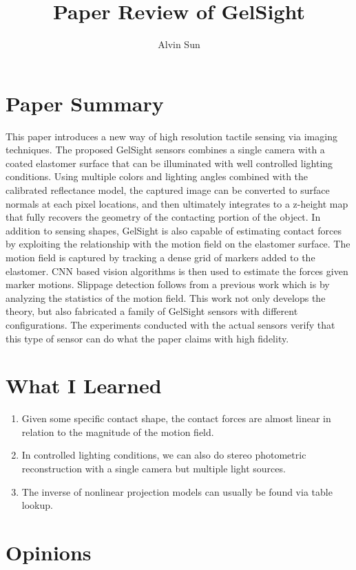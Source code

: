\documentclass[10pt, twocolumn]{article}
\title{\vspace{-3.0em}Paper Review of GelSight}
\author{Alvin Sun}
\begin{document}
\maketitle

\section{Paper Summary}
This paper introduces a new way of high resolution tactile sensing via
imaging techniques. The proposed GelSight sensors combines a single camera
with a coated elastomer surface that can be illuminated with well controlled
lighting conditions. Using multiple colors and lighting angles combined with
the calibrated reflectance model, the captured image can be converted to
surface normals at each pixel locations, and then ultimately integrates to
a z-height map that fully recovers the geometry of the contacting portion of
the object. In addition to sensing shapes, GelSight is also capable of estimating
contact forces by exploiting the relationship with the motion field on the
elastomer surface. The motion field is captured by tracking a dense grid of
markers added to the elastomer. CNN based vision algorithms is then used to
estimate the forces given marker motions. Slippage detection follows from a
previous work which is by analyzing the statistics of the motion field. This
work not only develops the theory, but also fabricated a family of GelSight
sensors with different configurations. The experiments conducted with the actual
sensors verify that this type of sensor can do what the paper claims with high
fidelity.

\section{What I Learned}
\begin{enumerate}
  \item Given some specific contact shape, the contact forces are almost linear
    in relation to the magnitude of the motion field.

  \item In controlled lighting conditions, we can also do stereo photometric
    reconstruction with a single camera but multiple light sources.

  \item The inverse of nonlinear projection models can usually be found via
    table lookup.
\end{enumerate}

\section{Opinions}
\end{document}
